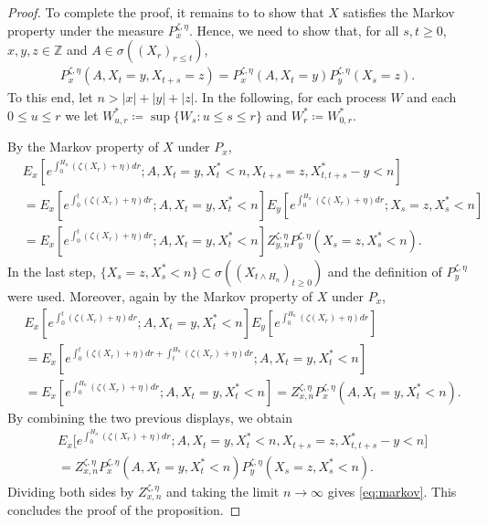 \documentclass[12pt,reqno,oneside]{amsart}
\numberwithin{equation}{section}
\theoremstyle{definition}
\theoremstyle{remark}
\newcommand{\Z}{\mathbb{Z}}
\begin{document}
\begin{proof}
  To complete the proof, it remains to to show that $X$ satisfies the Markov
  property under the measure $P_x^{\zeta, \eta}$. Hence, we
  need to show that, for all $s,t \geq 0$, $x,y,z \in \Z$ and
  $A\in \sigma((X_r)_{r \leq t})$,
  \begin{align}
    \label{eq:markov}
    P_x^{\zeta, \eta}(A, X_t=y, X_{t+s}=z)
    = P_x^{\zeta, \eta}(A,X_t=y ) P_y^{\zeta, \eta}(X_s=z).
  \end{align}
  To this end, let $n >|x|+|y|+|z|$. In the following, for each process $W$
  and each $0 \leq u \leq r$ we let
  $W^{*}_{u,r}\coloneq \sup \{W_s:u \leq s \leq r\}$ and $W^{*}_r\coloneq W^{*}_{0,r}$.

  By the Markov property of $X$ under $P_x$,
  \begin{align*}
    & E_x\left[ e^{\int_0^{H_{n}} (\zeta(X_r) + \eta)dr};
      A,X_t=y,X^*_t<n, X_{t+s}=z, X_{t,t+s}^{*}-y<n \right]
    \\&= E_x\left[ e^{\int_0^t (\zeta(X_r) + \eta)dr};
      A,X_t=y , X^*_t<n\right]
    E_y\left[ e^{\int_{0}^{H_{n}} (\zeta(X_r) + \eta)dr};X_s=z, X^*_s<n\right]
    \\&=E_x\left[ e^{\int_0^t (\zeta(X_r) + \eta)dr}; A,X_t=y , X^*_t<n \right]
    Z_{y,n}^{\zeta, \eta} P_y^{\zeta, \eta} (X_s=z, X^*_s<n ).
  \end{align*}
  In the last step,
  $\{X_s =z, X_s^* <n\} \subset \sigma((X_{t \wedge H_n})_{t \geq 0})$ and
  the definition of $P_y^{\zeta, \eta}$ were used. Moreover, again by the
  Markov property of $X$ under $P_x$,
  \begin{align*}
    & E_x\left[ e^{\int_0^t (\zeta(X_r) + \eta)dr}; A,X_t=y , X^*_t<n\right] E_y \left[ e^{\int_0^{H_n}(\zeta(X_r)+\eta) dr} \right] \\
    &=E_x\left[ e^{\int_0^{t} (\zeta(X_r) + \eta)dr+\int_t^{H_n} (\zeta(X_r) + \eta)dr}; A,X_t=y , X^*_t<n \right] \\
    &= E_x\left[ e^{\int_0^{H_n} (\zeta(X_r) + \eta)dr} ; A,X_t=y , X^*_t<n \right] = Z_{x,n}^{\zeta, \eta} P_{x}^{\zeta, \eta}(A,X_t=y , X^*_t<n).
  \end{align*}
  By combining the two previous displays, we obtain
  \begin{align*}
    & E_x\Big[ e^{\int_0^{H_{n}} (\zeta(X_r) + \eta)dr};
      A,X_t=y,X^*_t<n, X_{t+s}=z, X_{t,t+s}^{*}-y<n \Big] \\
    &= Z_{x,n}^{\zeta, \eta} P_{x}^{\zeta, \eta} (A,X_t=y , X^*_t<n)
    P_y^{\zeta, \eta} (X_s=z, X^*_s<n ).
  \end{align*}
  Dividing both sides
  by $Z_{x,n}^{\zeta, \eta}$ and taking the limit $n \rightarrow \infty$ gives \eqref{eq:markov}.
  This concludes the proof of the proposition.
\end{proof}
\end{document}

